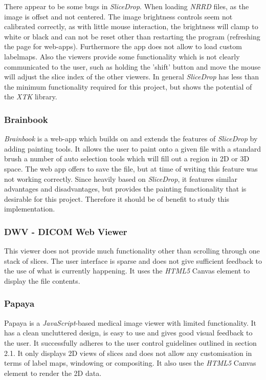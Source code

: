 \documentclass[a4paper,11pt,titlepage]{article}
\begin{document}
There appear to be some bugs in \textit{SliceDrop}. When loading \textit{NRRD} files, as the image is offset and not centered. The image brightness controls seem not calibrated correctly, as with little mouse interaction, the brightness will clamp to white or black and can not be reset other than restarting the program (refreshing the page for web-apps). Furthermore the app does not allow to load custom labelmaps. Also the viewers provide some functionality which is not clearly communicated to the user, such as holding the 'shift' button and move the mouse will adjust the slice index of the other viewers. In general \textit{SliceDrop} has less than the minimum functionality required for this project, but shows the potential of the \textit{XTK} library. 


\subsubsection{Brainbook}
\textit{Brainbook}\cite{brainbook} is a web-app which builds on and extends the features of \textit{SliceDrop} by adding painting tools. It allows the user to paint onto a given file with a standard brush a number of auto selection tools which will fill out a region in 2D or 3D space. The web app offers to save the file, but at time of writing this feature was not working correctly. Since heavily based on \textit{SliceDrop}, it features similar advantages and disadvantages, but provides the painting functionality that is desirable for this project. Therefore it should be of benefit to study this implementation.

\subsubsection{DWV - DICOM Web Viewer}
This viewer does not provide much functionality other than scrolling through one stack of slices. The user interface is sparse and does not give sufficient feedback to the use of what is currently happening. It uses the \textit{HTML5} Canvas element to display the file contents.



\subsubsection{Papaya}
Papaya\cite{papaya} is a \textit{JavaScript}-based medical image viewer with limited functionality. It has a clean uncluttered design, is easy to use and gives good visual feedback to the user. It successfully adheres to the user control guidelines outlined in section 2.1. It only displays 2D views of slices and does not allow any customisation in terms of label maps, windowing or compositing. It also uses the \textit{HTML5} Canvas element to render the 2D data.
\end{document}
